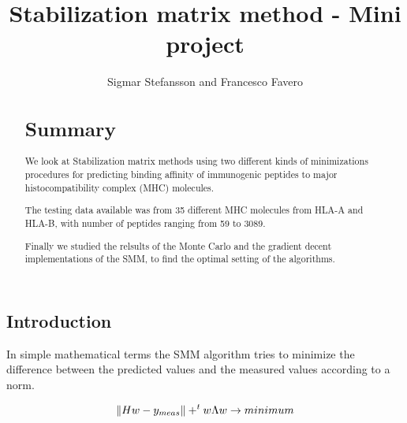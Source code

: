 \documentclass{bioinfo}
\begin{document}
\begin{application}

\title[SMM Project]{Stabilization matrix method - Mini project}
\author[Sigmar Stefansson, Francesco Favero]{Sigmar Stefansson and Francesco Favero}
\address{Danmarks Tekniske Univeristet}



\maketitle

\begin{abstract}

\section{Summary}
We look at Stabilization matrix methods using two different kinds of minimizations procedures \cite{SMM} for predicting binding \cite{netMHC} affinity of immunogenic peptides to major histocompatibility complex \cite{wiki:MHC} (MHC) molecules.
\par The testing data available was from 35 different MHC molecules from HLA-A and HLA-B, with number of peptides ranging from 59 to 3089.
\par Finally we studied the relsults of the Monte Carlo and the gradient decent implementations of the SMM, to find the optimal setting of the algorithms.

\end{abstract}

\section*{Introduction}

In simple mathematical terms the SMM algorithm tries to minimize the difference between the predicted values and the measured values according to a norm.

\begin{equation}
\label{eq:01}
\| H w - y_{meas}\| + ^tw \Lambda w \rightarrow minimum \\
\end{equation}


\end{application}
\end{document}
